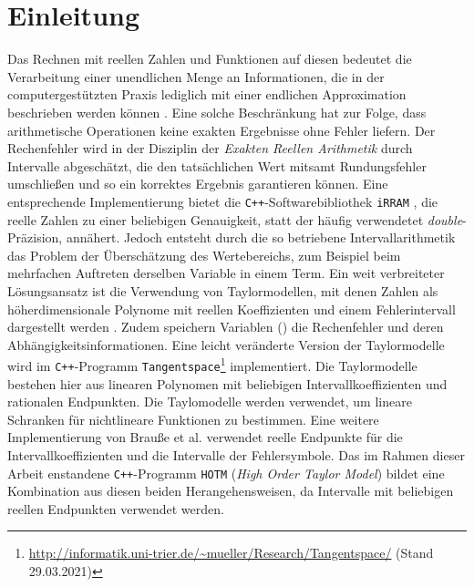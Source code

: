 
\chapter{Einleitung}
\label{ch:Einleitung}

Das Rechnen mit reellen Zahlen und Funktionen auf diesen bedeutet die Verarbeitung einer unendlichen Menge an Informationen, die in der computergestützten Praxis lediglich mit einer endlichen Approximation beschrieben werden können \cite{Brattka2008}. Eine solche Beschränkung hat zur Folge, dass arithmetische Operationen keine exakten Ergebnisse ohne Fehler liefern. Der Rechenfehler wird in der Disziplin der \textit{Exakten Reellen Arithmetik} durch Intervalle abgeschätzt, die den tatsächlichen Wert mitsamt Rundungsfehler umschließen und so ein korrektes Ergebnis garantieren können. Eine entsprechende Implementierung bietet die \verb.C++.-Softwarebibliothek \verb+iRRAM+ \cite{Mller2009EnhancingIE}, die reelle Zahlen zu einer beliebigen Genauigkeit, statt der häufig verwendetet \textit{double}-Präzision, annähert.
Jedoch entsteht durch die so betriebene Intervallarithmetik das Problem der Überschätzung des Wertebereichs, zum Beispiel beim mehrfachen Auftreten derselben Variable in einem Term. Ein weit verbreiteter Lösungsansatz ist die Verwendung von Taylormodellen, mit denen Zahlen als höherdimensionale Polynome mit reellen Koeffizienten und einem Fehlerintervall dargestellt werden \cite{DBLP:conf/macis/BrausseKM15} \cite{makino2001}. Zudem speichern Variablen () die Rechenfehler und deren Abhängigkeitsinformationen. Eine leicht veränderte Version der Taylormodelle wird im \verb.C++.-Programm \verb+Tangentspace+\footnote{\url{http://informatik.uni-trier.de/~mueller/Research/Tangentspace/} (Stand 29.03.2021)} implementiert. Die Taylormodelle bestehen hier aus linearen Polynomen mit beliebigen Intervallkoeffizienten und rationalen Endpunkten. Die Taylomodelle werden verwendet, um lineare Schranken für nichtlineare Funktionen zu bestimmen. Eine weitere Implementierung von Brauße et al. \cite{DBLP:conf/macis/BrausseKM15} verwendet reelle Endpunkte für die Intervallkoeffizienten und die Intervalle der Fehlersymbole. Das im Rahmen dieser Arbeit enstandene \verb.C++.-Programm \verb+HOTM+ (\textit{High Order Taylor Model}) bildet eine Kombination aus diesen beiden Herangehensweisen, da Intervalle mit beliebigen reellen Endpunkten verwendet werden. 

